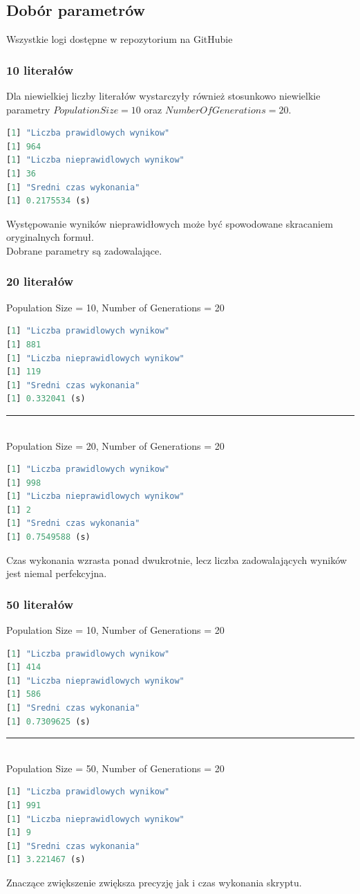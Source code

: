 \documentclass[11pt]{article}
\theoremstyle{note}
\begin{document}
\subsection{Dobór parametrów}
Wszystkie logi dostępne w repozytorium na GitHubie
\subsubsection{10 literałów}
Dla niewielkiej liczby literałów wystarczyły również stosunkowo niewielkie parametry  $Population Size=10$ oraz $NumberOfGenerations=20$. \\
\begin{lstlisting}[language=R]
[1] "Liczba prawidlowych wynikow"
[1] 964
[1] "Liczba nieprawidlowych wynikow"
[1] 36
[1] "Sredni czas wykonania"
[1] 0.2175534 (s)
\end{lstlisting}
Występowanie wyników nieprawidłowych może być spowodowane skracaniem oryginalnych formuł. \\
Dobrane parametry są zadowalające.

\subsubsection{20 literałów}
Population Size = 10, Number of Generations = 20
\begin{lstlisting}[language=R]
[1] "Liczba prawidlowych wynikow"
[1] 881
[1] "Liczba nieprawidlowych wynikow"
[1] 119
[1] "Sredni czas wykonania"
[1] 0.332041 (s)
\end{lstlisting}
\noindent\rule{13cm}{0.4pt}\\
Population Size = 20, Number of Generations = 20
\begin{lstlisting}[language=R]
[1] "Liczba prawidlowych wynikow"
[1] 998
[1] "Liczba nieprawidlowych wynikow"
[1] 2
[1] "Sredni czas wykonania"
[1] 0.7549588 (s)
\end{lstlisting}
Czas wykonania wzrasta ponad dwukrotnie, lecz liczba zadowalających wyników jest niemal perfekcyjna.
\newpage
\subsubsection{50 literałów}
Population Size = 10, Number of Generations = 20
\begin{lstlisting}[language=R]
[1] "Liczba prawidlowych wynikow"
[1] 414
[1] "Liczba nieprawidlowych wynikow"
[1] 586
[1] "Sredni czas wykonania"
[1] 0.7309625 (s)
\end{lstlisting}
\noindent\rule{13cm}{0.4pt}\\
Population Size = 50, Number of Generations = 20
\begin{lstlisting}[language=R]
[1] "Liczba prawidlowych wynikow"
[1] 991
[1] "Liczba nieprawidlowych wynikow"
[1] 9
[1] "Sredni czas wykonania"
[1] 3.221467 (s)
\end{lstlisting}
Znaczące zwiększenie zwiększa precyzję jak i czas wykonania skryptu.
\end{document}
